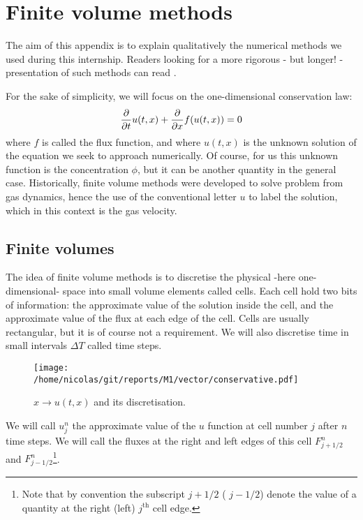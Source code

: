 
\chapter{Finite volume methods}
\label{app:finite}

The aim of this appendix is to explain qualitatively the numerical methods we used during this internship.  Readers looking for a more rigorous - but longer! - presentation of such methods can read \cite{leveque}. 

For the sake of simplicity, we will focus on the one-dimensional conservation law:
\begin{equation}
	\frac{\partial {}}{\partial {t}} u(t,x) + \frac{\partial {}}{\partial {x}} f(u(t,x)) = 0
\end{equation}
where $f$ is called the flux function, and where $u(t,x)$ is the unknown solution of the equation we seek to approach numerically. Of course, for us this unknown function is the concentration $\phi$, but it can be another quantity in the general case. Historically, finite volume methods were developed to solve problem from gas dynamics, hence the use of the conventional letter $u$ to label the solution, which in this context is the gas velocity. 

\section{Finite volumes}

The idea of finite volume methods is to discretise the physical -here one-dimensional- space into small volume elements called cells. 
Each cell hold two bits of information: the approximate value of the solution inside the cell, and the approximate value of the flux at each edge of the cell. Cells are usually rectangular, but it is of course not a requirement.
We will also discretise time in small intervals $\Delta T$ called time steps. 

\begin{figure}[htp]
\centering
\texttt{[image: /home/nicolas/git/reports/M1/vector/conservative.pdf]}
\caption{$x \rightarrow u(t,x)$ and its discretisation.}
\label{}
\end{figure}

We will call  $u_j^n$ the approximate value of the $u$ function at cell number $j$ after $n$ time steps. We will call the fluxes at the right and left edges of this cell $F_{j+1/2}^n$ and $F_{j-1/2}^n$\footnote{Note that by convention the subscript $j+1/2$ ( $j-1/2$) denote the value of a quantity at the right (left) $j^{\text{th}}$ cell edge.}.

